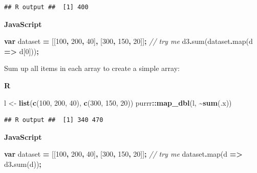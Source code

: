 \documentclass[
  openany]{book}
\newenvironment{Shaded}{\begin{snugshade}}{\end{snugshade}}
\newcommand{\CommentTok}[1]{\textcolor[rgb]{0.56,0.35,0.01}{\textit{#1}}}
\newcommand{\DecValTok}[1]{\textcolor[rgb]{0.00,0.00,0.81}{#1}}
\newcommand{\FunctionTok}[1]{\textcolor[rgb]{0.00,0.00,0.00}{#1}}
\newcommand{\KeywordTok}[1]{\textcolor[rgb]{0.13,0.29,0.53}{\textbf{#1}}}
\newcommand{\NormalTok}[1]{#1}
\newcommand{\OperatorTok}[1]{\textcolor[rgb]{0.81,0.36,0.00}{\textbf{#1}}}
\newcommand{\StringTok}[1]{\textcolor[rgb]{0.31,0.60,0.02}{#1}}
\begin{document}
\begin{verbatim}
## R output ##  [1] 400
\end{verbatim}

\textbf{JavaScript}

\begin{Shaded}
\begin{Highlighting}[]
\KeywordTok{var}\NormalTok{ dataset }\OperatorTok{=}\NormalTok{ [[}\DecValTok{100}\OperatorTok{,} \DecValTok{200}\OperatorTok{,} \DecValTok{40}\NormalTok{]}\OperatorTok{,}\NormalTok{ [}\DecValTok{300}\OperatorTok{,} \DecValTok{150}\OperatorTok{,} \DecValTok{20}\NormalTok{]]}\OperatorTok{;}     \CommentTok{// try me}
\NormalTok{d3}\OperatorTok{.}\FunctionTok{sum}\NormalTok{(dataset}\OperatorTok{.}\FunctionTok{map}\NormalTok{(d }\KeywordTok{=\textgreater{}}\NormalTok{ d[}\DecValTok{0}\NormalTok{]))}\OperatorTok{;}
\end{Highlighting}
\end{Shaded}

Sum up all items in each array to create a simple array:

\textbf{R}

\begin{Shaded}
\begin{Highlighting}[]
\NormalTok{l \textless{}{-}}\StringTok{ }\KeywordTok{list}\NormalTok{(}\KeywordTok{c}\NormalTok{(}\DecValTok{100}\NormalTok{, }\DecValTok{200}\NormalTok{, }\DecValTok{40}\NormalTok{), }\KeywordTok{c}\NormalTok{(}\DecValTok{300}\NormalTok{, }\DecValTok{150}\NormalTok{, }\DecValTok{20}\NormalTok{))}
\NormalTok{purrr}\OperatorTok{::}\KeywordTok{map\_dbl}\NormalTok{(l, }\OperatorTok{\textasciitilde{}}\KeywordTok{sum}\NormalTok{(.x))}
\end{Highlighting}
\end{Shaded}

\begin{verbatim}
## R output ##  [1] 340 470
\end{verbatim}

\textbf{JavaScript}

\begin{Shaded}
\begin{Highlighting}[]
\KeywordTok{var}\NormalTok{ dataset }\OperatorTok{=}\NormalTok{ [[}\DecValTok{100}\OperatorTok{,} \DecValTok{200}\OperatorTok{,} \DecValTok{40}\NormalTok{]}\OperatorTok{,}\NormalTok{ [}\DecValTok{300}\OperatorTok{,} \DecValTok{150}\OperatorTok{,} \DecValTok{20}\NormalTok{]]}\OperatorTok{;}     \CommentTok{// try me}
\NormalTok{dataset}\OperatorTok{.}\FunctionTok{map}\NormalTok{(d }\KeywordTok{=\textgreater{}}\NormalTok{ d3}\OperatorTok{.}\FunctionTok{sum}\NormalTok{(d))}\OperatorTok{;}
\end{Highlighting}
\end{Shaded}
\end{document}
